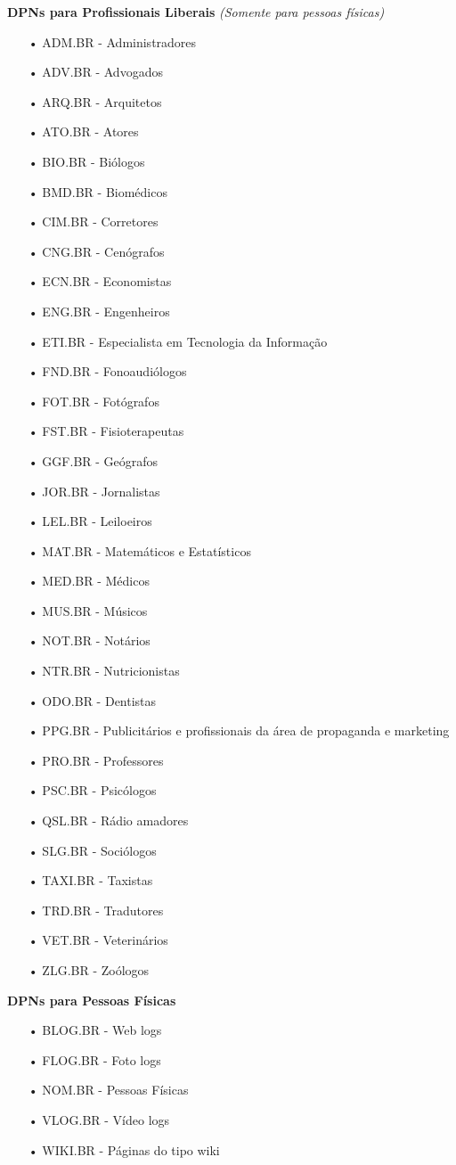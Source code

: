 \documentclass[12pt, a4paper]{abnt}
\begin{document}
\textbf{DPNs para Profissionais Liberais} \textit{(Somente para pessoas físicas)}
\begin{enumerate}
\item[•] ADM.BR - Administradores
\item[•] ADV.BR - Advogados
\item[•] ARQ.BR - Arquitetos
\item[•] ATO.BR - Atores
\item[•] BIO.BR - Biólogos
\item[•] BMD.BR - Biomédicos
\item[•] CIM.BR - Corretores
\item[•] CNG.BR - Cenógrafos
\item[•] ECN.BR - Economistas
\item[•] ENG.BR - Engenheiros
\item[•] ETI.BR - Especialista em Tecnologia da Informação
\item[•] FND.BR - Fonoaudiólogos
\item[•] FOT.BR - Fotógrafos
\item[•] FST.BR - Fisioterapeutas
\item[•] GGF.BR - Geógrafos
\item[•] JOR.BR - Jornalistas
\item[•] LEL.BR - Leiloeiros
\item[•] MAT.BR - Matemáticos e Estatísticos
\item[•] MED.BR - Médicos
\item[•] MUS.BR - Músicos
\item[•] NOT.BR - Notários
\item[•] NTR.BR - Nutricionistas
\item[•] ODO.BR - Dentistas
\item[•] PPG.BR - Publicitários e profissionais da área de propaganda e marketing
\item[•] PRO.BR - Professores
\item[•] PSC.BR - Psicólogos
\item[•] QSL.BR - Rádio amadores
\item[•] SLG.BR - Sociólogos
\item[•] TAXI.BR - Taxistas
\item[•] TRD.BR - Tradutores
\item[•] VET.BR - Veterinários
\item[•] ZLG.BR - Zoólogos
\end{enumerate}

\textbf{DPNs para Pessoas Físicas}
\begin{enumerate}
\item[•] BLOG.BR - Web logs
\item[•] FLOG.BR - Foto logs
\item[•] NOM.BR - Pessoas Físicas
\item[•] VLOG.BR - Vídeo logs
\item[•] WIKI.BR - Páginas do tipo wiki
\end{enumerate}
\end{document}
